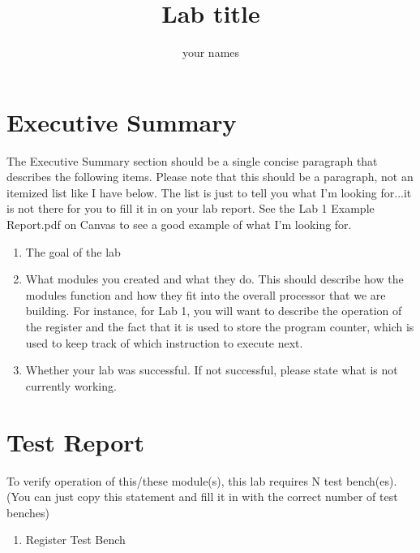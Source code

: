 \documentclass{article}
\author{your names}
\title{Lab title}
\begin{document}
\maketitle

\section{Executive Summary}
The Executive Summary section should be a single concise paragraph that describes the following items.  Please note that this should be a paragraph, not an itemized list like I have below.  The list is just to tell you what I'm looking for...it is not there for you to fill it in on your lab report.  See the Lab 1 Example Report.pdf on Canvas to see a good example of what I'm looking for.
\begin{enumerate}
	\item The goal of the lab
	\item What modules you created and what they do.  This should describe how the modules function and how they fit into the overall processor that we are building.  For instance, for Lab 1, you will want to describe the operation of the register and the fact that it is used to store the program counter, which is used to keep track of which instruction to execute next.
	\item Whether your lab was successful.  If not successful, please state what is not currently working.
\end{enumerate}	

\section{Test Report}
To verify operation of this/these module(s), this lab requires N test bench(es).  (You can just copy this statement and fill it in with the correct number of test benches)
\begin{enumerate}
	\item Register Test Bench
\end{enumerate}

\end{document}
